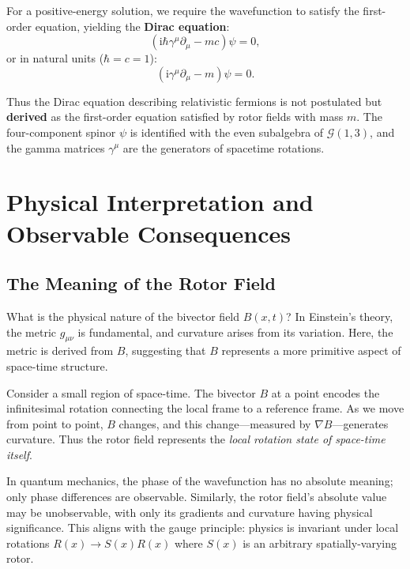 \documentclass[11pt,a4paper]{article}
\numberwithin{equation}{section}
\theoremstyle{plain}
\theoremstyle{definition}
\theoremstyle{remark}
\newcommand{\ii}{\mathrm{i}}
\begin{document}
For a positive-energy solution, we require the wavefunction to satisfy the first-order equation, yielding the \textbf{Dirac equation}:
\begin{equation}
(\ii\hbar\gamma^\mu \partial_\mu - mc)\psi = 0,
\label{eq:dirac}
\end{equation}
or in natural units ($\hbar = c = 1$):
\begin{equation}
(\ii\gamma^\mu \partial_\mu - m)\psi = 0.
\end{equation}

Thus the Dirac equation describing relativistic fermions is not postulated but \textbf{derived} as the first-order equation satisfied by rotor fields with mass $m$. The four-component spinor $\psi$ is identified with the even subalgebra of $\mathcal{G}(1,3)$, and the gamma matrices $\gamma^\mu$ are the generators of spacetime rotations.

\section{Physical Interpretation and Observable Consequences}
\label{sec:physical}

\subsection{The Meaning of the Rotor Field}

What is the physical nature of the bivector field $B(x,t)$? In Einstein's theory, the metric $g_{\mu\nu}$ is fundamental, and curvature arises from its variation. Here, the metric is derived from $B$, suggesting that $B$ represents a more primitive aspect of space-time structure.

Consider a small region of space-time. The bivector $B$ at a point encodes the infinitesimal rotation connecting the local frame to a reference frame. As we move from point to point, $B$ changes, and this change---measured by $\nabla B$---generates curvature. Thus the rotor field represents the \emph{local rotation state of space-time itself}.

In quantum mechanics, the phase of the wavefunction has no absolute meaning; only phase differences are observable. Similarly, the rotor field's absolute value may be unobservable, with only its gradients and curvature having physical significance. This aligns with the gauge principle: physics is invariant under local rotations $R(x) \to S(x)R(x)$ where $S(x)$ is an arbitrary spatially-varying rotor.
\end{document}
